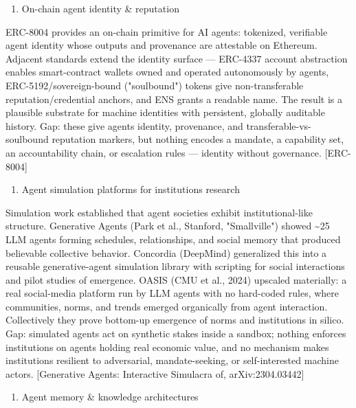 \documentclass[
]{article}
\providecommand{\tightlist}{%
  \setlength{\itemsep}{0pt}\setlength{\parskip}{0pt}}
\begin{document}
\begin{enumerate}
\def\labelenumi{\arabic{enumi}.}
\setcounter{enumi}{1}
\tightlist
\item
  On-chain agent identity \& reputation
\end{enumerate}

ERC-8004 provides an on-chain primitive for AI agents: tokenized,
verifiable agent identity whose outputs and provenance are attestable on
Ethereum. Adjacent standards extend the identity surface --- ERC-4337
account abstraction enables smart-contract wallets owned and operated
autonomously by agents, ERC-5192/sovereign-bound ("soulbound") tokens
give non-transferable reputation/credential anchors, and ENS grants a
readable name. The result is a plausible substrate for machine
identities with persistent, globally auditable history. Gap: these give
agents identity, provenance, and transferable-vs-soulbound reputation
markers, but nothing encodes a mandate, a capability set, an
accountability chain, or escalation rules --- identity without
governance. {[}ERC-8004{]}

\begin{enumerate}
\def\labelenumi{\arabic{enumi}.}
\setcounter{enumi}{2}
\tightlist
\item
  Agent simulation platforms for institutions research
\end{enumerate}

Simulation work established that agent societies exhibit
institutional-like structure. Generative Agents (Park et al., Stanford,
"Smallville") showed \textasciitilde25 LLM agents forming schedules,
relationships, and social memory that produced believable collective
behavior. Concordia (DeepMind) generalized this into a reusable
generative-agent simulation library with scripting for social
interactions and pilot studies of emergence. OASIS (CMU et al., 2024)
upscaled materially: a real social-media platform run by LLM agents with
no hard-coded rules, where communities, norms, and trends emerged
organically from agent interaction. Collectively they prove bottom-up
emergence of norms and institutions in silico. Gap: simulated agents act
on synthetic stakes inside a sandbox; nothing enforces institutions on
agents holding real economic value, and no mechanism makes institutions
resilient to adversarial, mandate-seeking, or self-interested machine
actors. {[}Generative Agents: Interactive Simulacra of,
arXiv:2304.03442{]}

\begin{enumerate}
\def\labelenumi{\arabic{enumi}.}
\setcounter{enumi}{3}
\tightlist
\item
  Agent memory \& knowledge architectures
\end{enumerate}
\end{document}
